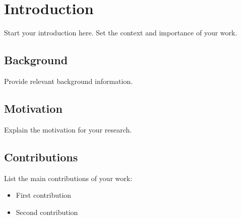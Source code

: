 \section{Introduction}
\label{sec:introduction}

Start your introduction here. Set the context and importance of your work.

\subsection{Background}
Provide relevant background information.

\subsection{Motivation}
Explain the motivation for your research.

\subsection{Contributions}
List the main contributions of your work:
\begin{itemize}
    \item First contribution
    \item Second contribution
\end{itemize}